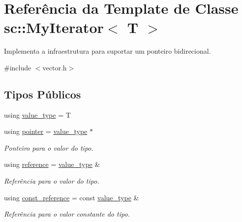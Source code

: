 \hypertarget{classsc_1_1MyIterator}{}\section{Referência da Template de Classe sc\+:\+:My\+Iterator$<$ T $>$}
\label{classsc_1_1MyIterator}


Implementa a infraestrutura para suportar um ponteiro bidirecional.  




{\ttfamily \#include $<$vector.\+h$>$}

\subsection*{Tipos Públicos}
\begin{DoxyCompactItemize}
\item 
using \hyperlink{classsc_1_1MyIterator_a87259a3ccf8ff488d496b658324c4b2d}{value\+\_\+type} = T
\item 
\mbox{\label{classsc_1_1MyIterator_aac55734d4d00af05ed90556dd8f8df0b}} 
using \hyperlink{classsc_1_1MyIterator_aac55734d4d00af05ed90556dd8f8df0b}{pointer} = \hyperlink{classsc_1_1MyIterator_a87259a3ccf8ff488d496b658324c4b2d}{value\+\_\+type} $\ast$
\begin{DoxyCompactList}\small\item\em Ponteiro para o valor do tipo. \end{DoxyCompactList}\item 
\mbox{\label{classsc_1_1MyIterator_a713949524e31c23eade8ea3521c938ef}} 
using \hyperlink{classsc_1_1MyIterator_a713949524e31c23eade8ea3521c938ef}{reference} = \hyperlink{classsc_1_1MyIterator_a87259a3ccf8ff488d496b658324c4b2d}{value\+\_\+type} \&
\begin{DoxyCompactList}\small\item\em Referência para o valor do tipo. \end{DoxyCompactList}\item 
\mbox{\label{classsc_1_1MyIterator_ad8f5e1835e5247b500a08297a4f79a3c}} 
using \hyperlink{classsc_1_1MyIterator_ad8f5e1835e5247b500a08297a4f79a3c}{const\+\_\+reference} = const \hyperlink{classsc_1_1MyIterator_a87259a3ccf8ff488d496b658324c4b2d}{value\+\_\+type} \&
\begin{DoxyCompactList}\small\item\em Referência para o valor constante do tipo. \end{DoxyCompactList}\item 

\end{DoxyCompactItemize}

